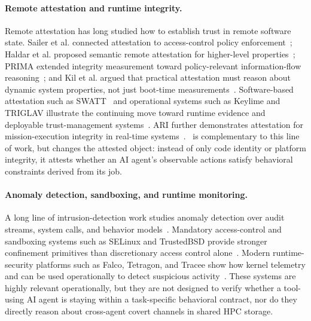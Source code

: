 \paragraph{Remote attestation and runtime integrity.}
Remote attestation has long studied how to establish trust in remote software state. Sailer et al. connected attestation to access-control policy enforcement~\cite{sailer2004attestation}; Haldar et al. proposed semantic remote attestation for higher-level properties~\cite{haldar2004semantic}; PRIMA extended integrity measurement toward policy-relevant information-flow reasoning~\cite{jaeger2006prima}; and Kil et al. argued that practical attestation must reason about dynamic system properties, not just boot-time measurements~\cite{kil2009redas}. Software-based attestation such as SWATT~\cite{seshadri2004swatt} and operational systems such as Keylime and TRIGLAV illustrate the continuing move toward runtime evidence and deployable trust-management systems~\cite{schear2016keylime,ozga2021triglav}. ARI further demonstrates attestation for mission-execution integrity in real-time systems~\cite{wang2023ari}. \projectname~is complementary to this line of work, but changes the attested object: instead of only code identity or platform integrity, it attests whether an AI agent's observable actions satisfy behavioral constraints derived from its job.

\paragraph{Anomaly detection, sandboxing, and runtime monitoring.}
A long line of intrusion-detection work studies anomaly detection over audit streams, system calls, and behavior models~\cite{denning1987ids,forrest1996self,warrender1999syscalls,axelsson2000idssurvey}. Mandatory access-control and sandboxing systems such as SELinux and TrustedBSD provide stronger confinement primitives than discretionary access control alone~\cite{loscocco2001selinux,watson2003trustedbsd}. Modern runtime-security platforms such as Falco, Tetragon, and Tracee show how kernel telemetry and \ebpf can be used operationally to detect suspicious activity~\cite{falco2025docs,tetragon2025docs,tracee2025docs}. These systems are highly relevant operationally, but they are not designed to verify whether a tool-using AI agent is staying within a task-specific behavioral contract, nor do they directly reason about cross-agent covert channels in shared HPC storage.

